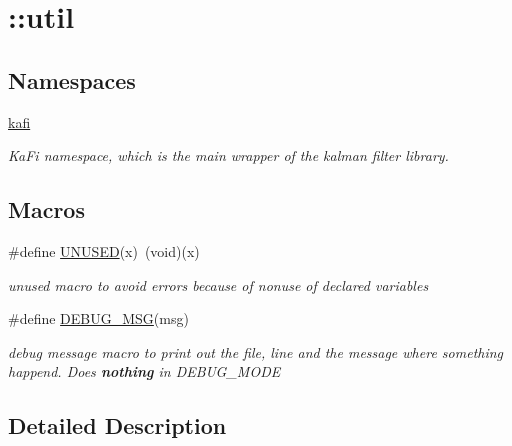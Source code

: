 \hypertarget{group__kafi}{}\section{\+:\+:util}
\label{group__kafi}
\subsection*{Namespaces}
\begin{DoxyCompactItemize}
\item 
 \hyperlink{namespacekafi}{kafi}
\begin{DoxyCompactList}\small\item\em Ka\+Fi namespace, which is the main wrapper of the kalman filter library. \end{DoxyCompactList}\end{DoxyCompactItemize}
\subsection*{Macros}
\begin{DoxyCompactItemize}
\item 
\mbox{\label{group__kafi_ga86d500a34c624c2cae56bc25a31b12f3}} 
\#define \hyperlink{group__kafi_ga86d500a34c624c2cae56bc25a31b12f3}{U\+N\+U\+S\+ED}(x)~(void)(x)
\begin{DoxyCompactList}\small\item\em unused macro to avoid errors because of nonuse of declared variables \end{DoxyCompactList}\item 
\mbox{\label{group__kafi_ga1ea6d4c0f0217715d1f79f1cf57e9c50}} 
\#define \hyperlink{group__kafi_ga1ea6d4c0f0217715d1f79f1cf57e9c50}{D\+E\+B\+U\+G\+\_\+\+M\+SG}(msg)
\begin{DoxyCompactList}\small\item\em debug message macro to print out the file, line and the message where something happend. Does {\bfseries nothing} in D\+E\+B\+U\+G\+\_\+\+M\+O\+DE \end{DoxyCompactList}\end{DoxyCompactItemize}


\subsection{Detailed Description}
